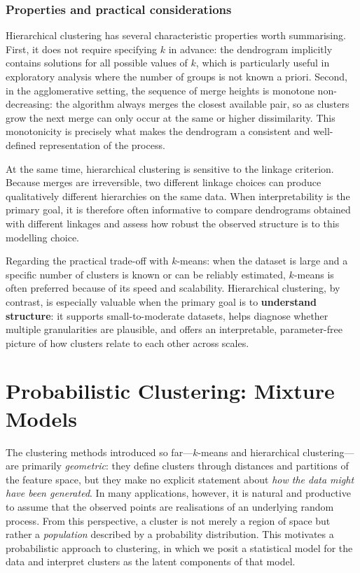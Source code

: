 \subsubsection*{Properties and practical considerations}

Hierarchical clustering has several characteristic properties worth summarising. First, it
does not require specifying $k$ in advance: the dendrogram implicitly contains solutions for
all possible values of $k$, which is particularly useful in exploratory analysis where the
number of groups is not known a priori. Second, in the agglomerative setting, the sequence
of merge heights is monotone non-decreasing: the algorithm always merges the closest
available pair, so as clusters grow the next merge can only occur at the same or higher
dissimilarity. This monotonicity is precisely what makes the dendrogram a consistent and
well-defined representation of the process.

At the same time, hierarchical clustering is sensitive to the linkage criterion. Because
merges are irreversible, two different linkage choices can produce qualitatively different
hierarchies on the same data. When interpretability is the primary goal, it is therefore often
informative to compare dendrograms obtained with different linkages and assess how robust
the observed structure is to this modelling choice.

Regarding the practical trade-off with $k$-means: when the dataset is large and a specific
number of clusters is known or can be reliably estimated, $k$-means is often preferred
because of its speed and scalability. Hierarchical clustering, by contrast, is especially
valuable when the primary goal is to \textbf{understand structure}: it supports
small-to-moderate datasets, helps diagnose whether multiple granularities are plausible,
and offers an interpretable, parameter-free picture of how clusters relate to each other
across scales.

\section*{Probabilistic Clustering: Mixture Models}

The clustering methods introduced so far---$k$-means and hierarchical clustering---are
primarily \emph{geometric}: they define clusters through distances and partitions of the
feature space, but they make no explicit statement about \emph{how the data might have
been generated}. In many applications, however, it is natural and productive to assume that
the observed points are realisations of an underlying random process. From this
perspective, a cluster is not merely a region of space but rather a \emph{population}
described by a probability distribution. This motivates a \alert{probabilistic approach} to
clustering, in which we posit a statistical model for the data and interpret clusters as the
latent components of that model.

